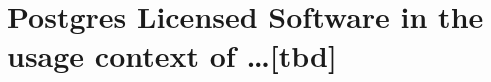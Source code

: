 %
%
%
%
%



\section{Postgres Licensed Software in the usage context of \ldots [tbd]}

\label{OSUC-01-PGL} \label{OSUC-03-PGL} 
\label{OSUC-06-PGL} \label{OSUC-09-PGL}

\label{OSUC-02-PGL} \label{OSUC-04-PGL} \label{OSUC-05-PGL}
\label{OSUC-07-PGL} \label{OSUC-08-PGL} \label{OSUC-10-PGL}


%
